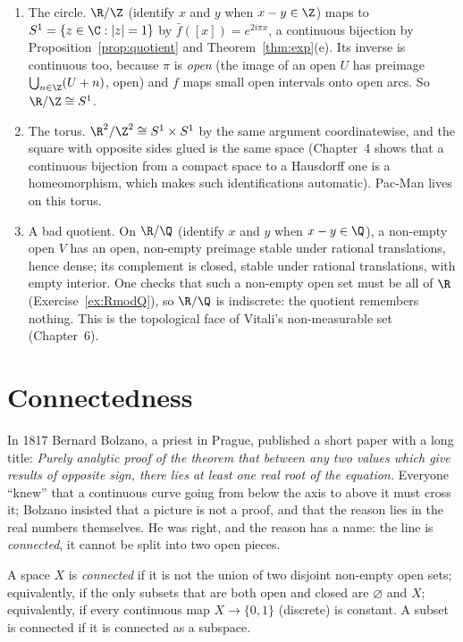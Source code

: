 \begin{example}\label{ex:quotients}
\begin{enumerate}[label=(\alph*)]
\item The circle. $\R/\Z$ (identify $x$ and $y$ when $x-y\in\Z$) maps to $S^1=\{z\in\C:|z|=1\}$ by $\bar f([x])=e^{2i\pi x}$, a continuous bijection by
Proposition~\ref{prop:quotient} and Theorem~\ref{thm:exp}(e). Its inverse is continuous too, because $\pi$ is \emph{open} (the image of an open $U$ has
preimage $\bigcup_{n\in\Z}(U+n)$, open) and $f$ maps small open intervals onto open arcs. So $\R/\Z\cong S^1$.
\item The torus. $\R^2/\Z^2\cong S^1\times S^1$ by the same argument coordinatewise, and the square with opposite sides glued is the same
space (Chapter~4 shows that a continuous bijection from a compact space to a Hausdorff one is a homeomorphism, which makes such
identifications automatic). Pac-Man lives on this torus.
\item A bad quotient. On $\R/\Q$ (identify $x$ and $y$ when $x-y\in\Q$), a non-empty open $V$ has an open, non-empty preimage stable under rational
translations, hence dense; its complement is closed, stable under rational translations, with empty interior. One checks
that such a non-empty open set must be all of $\R$ (Exercise~\ref{ex:RmodQ}), so $\R/\Q$ is indiscrete: the quotient remembers nothing. This
is the topological face of Vitali's non-measurable set (Chapter~6).
\end{enumerate}
\end{example}

\section{Connectedness}

In 1817 Bernard Bolzano, a priest in Prague, published a short paper with a long title: \emph{Purely analytic proof of the
theorem that between any two values which give results of opposite sign, there lies at least one real root of the
equation.} Everyone ``knew'' that a continuous curve going from below the axis to above it must cross it; Bolzano insisted
that a picture is not a proof, and that the reason lies in the real numbers themselves. He was right, and the reason has a
name: the line is \emph{connected}, it cannot be split into two open pieces.

\begin{definition}
A space $X$ is \emph{connected} if it is not the union of two disjoint non-empty open sets; equivalently, if the only subsets that are both
open and closed are $\varnothing$ and $X$; equivalently, if every continuous map $X\to\{0,1\}$ (discrete) is constant. A subset is connected if it is
connected as a subspace.
\end{definition}

